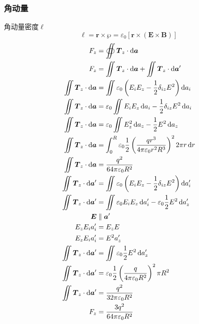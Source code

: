 \subsubsection{角动量}
角动量密度$\ell$
\begin{equation}
    \ell=\boldsymbol{r}\times\boldsymbol{\wp}=\varepsilon_0\left[\boldsymbol{r}\times(\boldsymbol E\times\boldsymbol B)\right]
\end{equation}
\begin{align*}
    F_z&=\oiint\boldsymbol{T}_z\cdot\dif\boldsymbol{a}\\
    F_z&=\iint\boldsymbol{T}_z\cdot\dif\boldsymbol{a}+\iint\boldsymbol{T}_z\cdot\dif\boldsymbol{a}'\\
    \iint\boldsymbol{T}_z\cdot\dif\boldsymbol{a}&=\iint\varepsilon_0\left(E_iE_z-\frac{1}{2}\delta_{iz}E^2\right)\dif a_i\\
    \iint\boldsymbol{T}_z\cdot\dif\boldsymbol{a}&=\varepsilon_0\iint E_iE_z\dif a_i
    -\frac{1}{2}\delta_{iz}E^2\dif a_i\\
    \iint\boldsymbol{T}_z\cdot\dif\boldsymbol{a}&=\varepsilon_0\iint
    E_z^2\dif a_z-\frac{1}{2}E^2\dif a_z\\
    \iint\boldsymbol{T}_z\cdot\dif\boldsymbol{a}&=\int_0^R
    \varepsilon_0\frac{1}{2}\left(\frac{qr^3}{4\pi\varepsilon_0 r^2R^3}\right)^22\pi r\dif r\\
    \iint\boldsymbol{T}_z\cdot\dif\boldsymbol{a}&=
    \frac{q^2}{64\pi\varepsilon_0R^2}\\
    \iint\boldsymbol{T}_z\cdot\dif\boldsymbol{a}'&=\iint\varepsilon_0\left(E_iE_z-\frac{1}{2}\delta_{iz}E^2\right)\dif a_i'\\
    \iint\boldsymbol{T}_z\cdot\dif\boldsymbol{a}'&=\iint \varepsilon_0E_iE_z\dif a_i'
    -\varepsilon_0\frac{1}{2}E^2\dif a_z'\\
    \boldsymbol{E}&\parallel \boldsymbol{a}'\\
    E_zE_ia'_i&=E_zE\\
    E_zE_ia'_i&=E^2a'_z\\
    \iint\boldsymbol{T}_z\cdot\dif\boldsymbol{a}'&=\iint \varepsilon_0\frac{1}{2}E^2\dif a_z'\\
    \iint\boldsymbol{T}_z\cdot\dif\boldsymbol{a}'&=\varepsilon_0\frac{1}{2}\left(\frac{q}{4\pi\varepsilon_0 R^2}\right)^2\pi R^2\\
    \iint\boldsymbol{T}_z\cdot\dif\boldsymbol{a}'&=\frac{q^2}{32\pi\varepsilon_0 R^2}\\
    F_z&=\frac{3q^2}{64\pi\varepsilon_0 R^2}
\end{align*}
